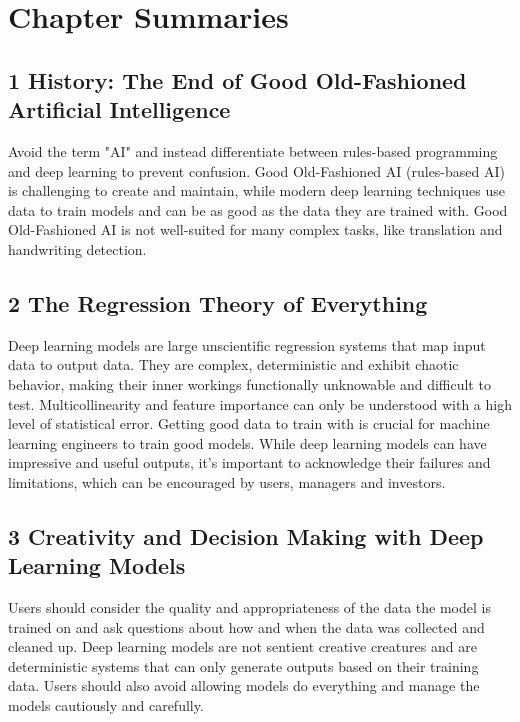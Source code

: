\chapter*{Chapter Summaries}

\section*{1 History: The End of Good Old-Fashioned Artificial Intelligence}

Avoid the term "AI" and instead differentiate between rules-based programming and deep learning to prevent confusion. Good Old-Fashioned AI (rules-based AI) is challenging to create and maintain, while modern deep learning techniques use data to train models and can be as good as the data they are trained with. Good Old-Fashioned AI is not well-suited for many complex tasks, like translation and handwriting detection.

\section*{2 The Regression Theory of Everything}

Deep learning models are large unscientific regression systems that map input data to output data. They are complex, deterministic and exhibit chaotic behavior, making their inner workings functionally unknowable and difficult to test. Multicollinearity and feature importance can only be understood with a high level of statistical error. Getting good data to train with is crucial for machine learning engineers to train good models. While deep learning models can have impressive and useful outputs, it's important to acknowledge their failures and limitations, which can be encouraged by users, managers and investors.

\section*{3 Creativity and Decision Making with Deep Learning Models}

Users should consider the quality and appropriateness of the data the model is trained on and ask questions about how and when the data was collected and cleaned up. Deep learning models are not sentient creative creatures and are deterministic systems that can only generate outputs based on their training data. Users should also avoid allowing models do everything and manage the models cautiously and carefully.

